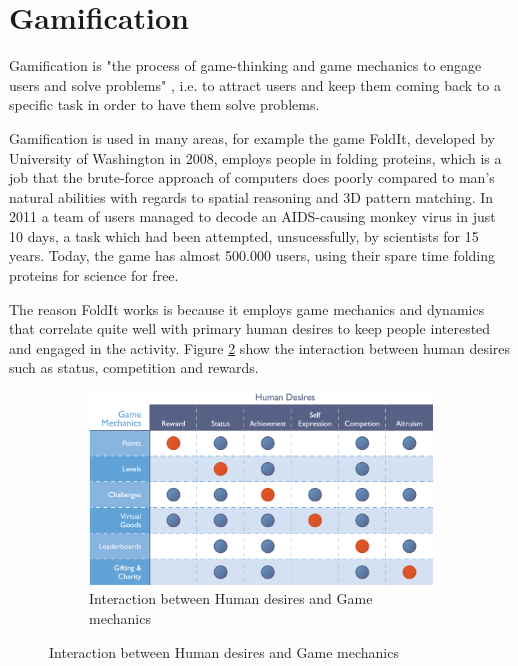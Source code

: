 \section{Gamification}\label{sec:gamification}
Gamification is "the process of game-thinking and game mechanics to engage users and solve problems" \cite{Zichermann2011}, i.e. to attract users and keep them coming back to a specific task in order to have them solve problems.

Gamification is used in many areas, for example the game FoldIt, developed by University of Washington in 2008, employs people in folding proteins, which is a job that the brute-force approach of computers does poorly compared to man's natural abilities with regards to spatial reasoning and 3D pattern matching. In 2011 a team of users managed to decode an AIDS-causing monkey virus in just 10 days, a task which had been attempted, unsucessfully, by scientists for 15 years.\cite{Huff2011} Today, the game has almost 500.000 users, using their spare time folding proteins for science for free.\cite{FoldIt2013}

The reason FoldIt works is because it employs game mechanics and dynamics that correlate quite well with primary human desires to keep people interested and engaged in the activity.
Figure \ref{fig:bunchball} show the interaction between human desires such as status, competition and rewards.

\begin{figure}
\begin{figure}[hptb]
  \centering
    \includegraphics[width=\textwidth]{img/bunchball.png}
  \caption{Interaction between Human desires and Game mechanics}
  \label{fig:bunchball}
\end{figure}
\end{figure}

